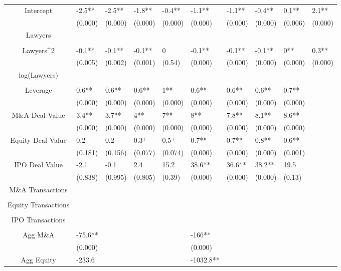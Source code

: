 \documentclass{article}
\begin{document}
\begin{table}[H]
\begin{tabular}{|clllllllll|}
Intercept & -2.5** & -2.5** & -1.8** & -0.4** & -1.1** & -1.1** & -0.4** & 0.1** & 2.1** \\
   & (0.000) & (0.000) & (0.000) & (0.000) & (0.000) & (0.000) & (0.000) & (0.006) & (0.000) \\
  Lawyers &  &  &  &  &  &  &  &  &  \\
   &  &  &  &  &  &  &  &  &  \\
  Lawyers^2 & -0.1** & -0.1** & -0.1** & 0 & -0.1** & -0.1** & -0.1** & 0** & 0.3** \\
   & (0.005) & (0.002) & (0.001) & (0.54) & (0.000) & (0.000) & (0.000) & (0.000) & (0.000) \\
  log(Lawyers) &  &  &  &  &  &  &  &  &  \\
   &  &  &  &  &  &  &  &  &  \\
  Leverage & 0.6** & 0.6** & 0.6** & 1** & 0.6** & 0.6** & 0.6** & 0.7** &  \\
   & (0.000) & (0.000) & (0.000) & (0.000) & (0.000) & (0.000) & (0.000) & (0.000) &  \\
  M\&A Deal Value & 3.4** & 3.7** & 4** & 7** & 8** & 7.8** & 8.1** & 8.6** &  \\
   & (0.000) & (0.000) & (0.000) & (0.000) & (0.000) & (0.000) & (0.000) & (0.000) &  \\
  Equity Deal Value & 0.2 & 0.2 & 0.3$^{+}$ & 0.5$^{+}$ & 0.7** & 0.7** & 0.8** & 0.6** &  \\
   & (0.181) & (0.156) & (0.077) & (0.074) & (0.000) & (0.000) & (0.000) & (0.001) &  \\
  IPO Deal Value & -2.1 & -0.1 & 2.4 & 15.2 & 38.6** & 36.6** & 38.2** & 19.5 &  \\
   & (0.838) & (0.995) & (0.805) & (0.39) & (0.000) & (0.000) & (0.000) & (0.13) &  \\
  M\&A Transactions &  &  &  &  &  &  &  &  &  \\
   &  &  &  &  &  &  &  &  &  \\
  Equity Transactions &  &  &  &  &  &  &  &  &  \\
   &  &  &  &  &  &  &  &  &  \\
  IPO Transactions &  &  &  &  &  &  &  &  &  \\
   &  &  &  &  &  &  &  &  &  \\
  Agg M\&A & -75.6** &  &  &  & -166** &  &  &  &  \\
   & (0.000) &  &  &  & (0.000) &  &  &  &  \\
  Agg Equity & -233.6 &  &  &  & -1032.8** &  &  &  &  \\

\end{tabular}
\end{table}
\end{document}
